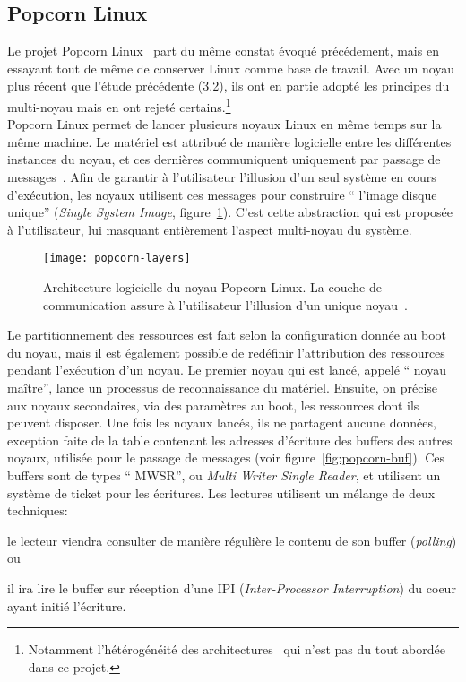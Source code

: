       
    \subsection{Popcorn Linux}

      Le projet Popcorn Linux~\citep{barbalacepopcorn} part du même constat
      évoqué précédement, mais en essayant tout de même de conserver Linux comme
      base de travail. Avec un noyau plus récent que l'étude précédente (3.2),
      ils ont en partie adopté les principes du multi-noyau mais en ont rejeté
      certains.\footnote{Notamment l'hétérogénéité des
        architectures~\citep{schupbach2008embracing} qui n'est pas du tout
        abordée dans ce projet.}\\

      Popcorn Linux permet de lancer plusieurs noyaux Linux en même temps sur la
      même machine. Le matériel est attribué de manière logicielle entre les
      différentes instances du noyau, et ces dernières communiquent uniquement
      par passage de messages~\citep{shelton2013popcorn}. Afin de garantir à
      l’utilisateur l’illusion d’un seul système en cours d'exécution, les
      noyaux utilisent ces messages pour construire `` l’image disque unique''
      (\textit{Single System Image}, figure~\ref{fig:popcorn-layers}). C'est
      cette abstraction qui est proposée à l'utilisateur, lui masquant
      entièrement l'aspect multi-noyau du système.

      \begin{figure}[ht]
        \centering
        \texttt{[image: popcorn-layers]}
        \caption{Architecture logicielle du noyau Popcorn Linux. La couche de
          communication assure à l'utilisateur l'illusion d'un unique
          noyau~\citep{barbalacepopcorn}.}
        \label{fig:popcorn-layers}
      \end{figure}

      Le partitionnement des ressources est fait selon la configuration donnée
      au boot du noyau, mais il est également possible de redéfinir
      l'attribution des ressources pendant l'exécution d'un noyau. Le premier
      noyau qui est lancé, appelé `` noyau maître'', lance un processus de
      reconnaissance du matériel. Ensuite, on précise aux noyaux secondaires,
      via des paramètres au boot, les ressources dont ils peuvent disposer. Une
      fois les noyaux lancés, ils ne partagent aucune données, exception faite
      de la table contenant les adresses d’écriture des buffers des autres
      noyaux, utilisée pour le passage de messages (voir
      figure~\ref{fig:popcorn-buf}). Ces buffers sont de types `` MWSR'', ou
      \textit{Multi Writer Single Reader}, et utilisent un système de ticket
      pour les écritures. Les lectures utilisent un mélange de deux
      techniques:\benumline \item le lecteur viendra consulter de manière
      régulière le contenu de son buffer (\textit{polling}) ou \item il ira lire
      le buffer sur réception d’une IPI (\textit{Inter-Processor Interruption})
      du coeur ayant initié l’écriture\eenumline.

